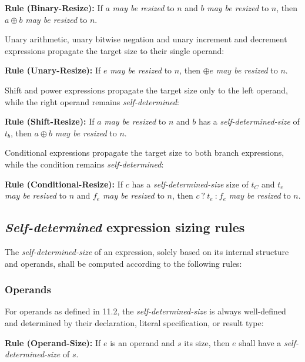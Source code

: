 \documentclass{article}
\newcommand{\sds}{\emph{self-determined-size}}
\newcommand{\mbr}{\emph{may be resized}}
\newenvironment{typingrule}[1]%
{\par\noindent\textbf{Rule (#1):} }%
{\par}
\begin{document}
\begin{typingrule}{Binary-Resize}
  If $a$ \mbr{} to $n$ and $b$ \mbr{} to $n$, then $a \oplus b$ \mbr{} to $n$.
\end{typingrule}

Unary arithmetic, unary bitwise negation and unary increment and decrement
expressions propagate the target size to their single operand:

\begin{typingrule}{Unary-Resize}
  If $e$ \mbr{} to $n$, then $\oplus e$ \mbr{} to $n$.
\end{typingrule}

Shift and power expressions propagate the target size only to the left operand,
while the right operand remains \emph{self-determined}:

\begin{typingrule}{Shift-Resize}
  If $a$ \mbr{} to $n$ and $b$ has a \sds{} of $t_{b}$, then
  $a \oplus b$ \mbr{} to $n$.
\end{typingrule}

Conditional expressions propagate the target size to both branch expressions,
while the condition remains \emph{self-determined}:

\begin{typingrule}{Conditional-Resize}
  If $c$ has a \sds{} size of $t_{C}$ and $t_{e}$ \mbr{} to $n$ and $f_{e}$
  \mbr{} to $n$, then $c~\texttt{?}~t_{e}~\texttt{:}~f_{e}$ \mbr{} to $n$.
\end{typingrule}

\subsection{\emph{Self-determined} expression sizing rules}%

The \sds{} of an expression, solely based on its internal
structure and operands, shall be computed according to the following rules:

\subsubsection{Operands}%

For operands as defined in 11.2, the \sds{} is always
well-defined and determined by their declaration, literal specification, or
result type:

\begin{typingrule}{Operand-Size}
  If $e$ is an operand and $s$ its size, then $e$ shall have a \sds{} of $s$.
\end{typingrule}
\end{document}
